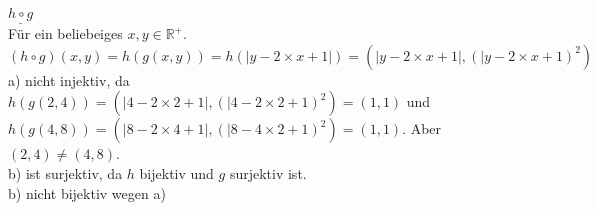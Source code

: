 \documentclass[a4paper]{scrartcl}
\begin{document}
\begin{flushleft}
		$\underline{h\circ g}$\\
		Für ein beliebeiges $x,y\in\mathbb{R^+}$.\\
		$(h\circ g)(x,y)=h(g(x,y))=h(|y-2\times x+1|)=(|y-2\times x+1|,(|y-2\times x +1)^2)$\\
		a) nicht injektiv, da $h(g(2,4))=(|4-2\times 2+1|,(|4-2\times 2 +1)^2)=(1,1)$ und $h(g(4,8))=(|8-2\times 4+1|,(|8-4\times 2 +1)^2)= (1,1)$. Aber $(2,4) \neq (4,8)$.\\
		b) ist surjektiv, da $h$ bijektiv und $g$ surjektiv ist.\\
		b) nicht bijektiv wegen a)\\[1em]
		
	\end{flushleft}
\end{document}
